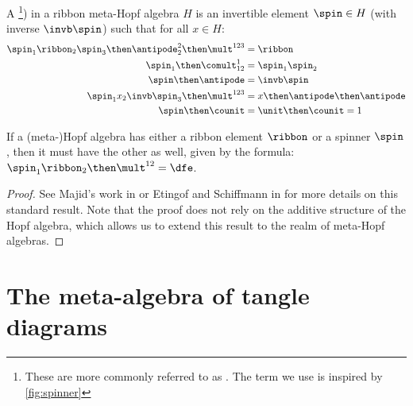 \begin{definition}[spinner]
        A \footnote{%
                These are more commonly referred to as . The term we use is inspired by
                \cref{fig:spinner}
        }) in a ribbon meta-Hopf algebra $H$ is an invertible element
        $\spin\in H$ (with inverse $\invb\spin$) such that for all $x\in H$:
        \begin{align}
                \label{eq:spinner_ribbon}
                \spin_1\ribbon_2\spin_3 \then \antipode^2_2 \then \mult^{123} &=
                \ribbon\\
                \label{eq:spinner_comult}
                \spin_1\then\comult^{1}_{12} &=\spin_1\spin_2\\
                \label{eq:spinner_antipode}
                \spin \then\antipode &= \invb\spin\\
                \label{eq:spinner_conjugate}
                \spin_{1}x_2\invb\spin_{3}\then\mult^{123} &=
                x \then \antipode \then \antipode\\
                \label{eq:spinner_counit}
                \spin \then \counit &= \unit \then \counit = 1
        \end{align}
\end{definition}

\begin{lemma}\label{lem:spinner_ribbon}
        If a (meta-)Hopf algebra has either a ribbon element $\ribbon$ or a spinner
        $\spin$, then it must have the other as well, given by the formula:
        $\spin_1 \ribbon_2 \then \mult^{12} = \dfe$.
\end{lemma}
\begin{proof}
        See Majid's work in \cite{SM} or Etingof and Schiffmann in \cite{ES}
        for more details on this standard result. Note that the proof does not
        rely on the additive structure of the Hopf algebra, which allows us to
        extend this result to the realm of meta-Hopf algebras.
\end{proof}

\section{The meta-algebra of tangle diagrams}
\label{sec:topological_interpretations}

